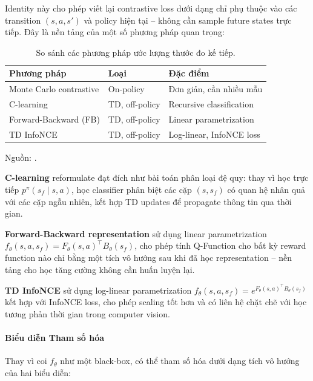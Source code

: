 Identity này cho phép viết lại contrastive loss dưới dạng chỉ phụ
thuộc vào các transition $(s, a, s')$ và policy hiện tại -- không cần
sample future states trực tiếp. Đây là nền tảng của một số phương
pháp quan trọng:

\begin{table}[H]
    \centering
    \caption{So sánh các phương pháp ước lượng thước đo kế tiếp.}
    \label{tab:td_methods}
    \begin{tabular}{lll}
        \toprule
        \textbf{Phương pháp} & \textbf{Loại} & \textbf{Đặc điểm} \\
        \midrule
        Monte Carlo contrastive & On-policy & Đơn giản, cần nhiều mẫu \\
        C-learning & TD, off-policy & Recursive classification \\
        Forward-Backward (FB) & TD, off-policy & Linear parametrization \\
        TD InfoNCE & TD, off-policy & Log-linear, InfoNCE loss \\
        \bottomrule
    \end{tabular}
\end{table}
Nguồn: \cite{eysenbach2025generativerl}.

\textbf{C-learning} \cite{eysenbach2025generativerl} reformulate
đạt đích như bài toán phân loại đệ quy: thay vì học trực tiếp
$p^\pi(s_f \mid s, a)$, học classifier phân biệt các cặp $(s, s_f)$
có quan hệ nhân quả với các cặp ngẫu nhiên, kết hợp TD updates để
propagate thông tin qua thời gian.

\textbf{Forward-Backward representation} sử dụng linear parametrization
$f_\theta(s, a, s_f) = F_\theta(s,a)^\top B_\theta(s_f)$, cho phép
tính Q-Function cho bất kỳ reward function nào chỉ bằng một tích vô
hướng sau khi đã học representation -- nền tảng cho học tăng cường không cần huấn luyện lại.

\textbf{TD InfoNCE} sử dụng log-linear parametrization
$f_\theta(s, a, s_f) = e^{F_\theta(s,a)^\top B_\theta(s_f)}$ kết hợp
với InfoNCE loss, cho phép scaling tốt hơn và có liên hệ chặt chẽ với
học tương phản thời gian trong computer vision.

\paragraph{Biểu diễn Tham số hóa}

Thay vì coi $f_\theta$ như một black-box, có thể tham số hóa dưới dạng
tích vô hướng của hai biểu diễn:

